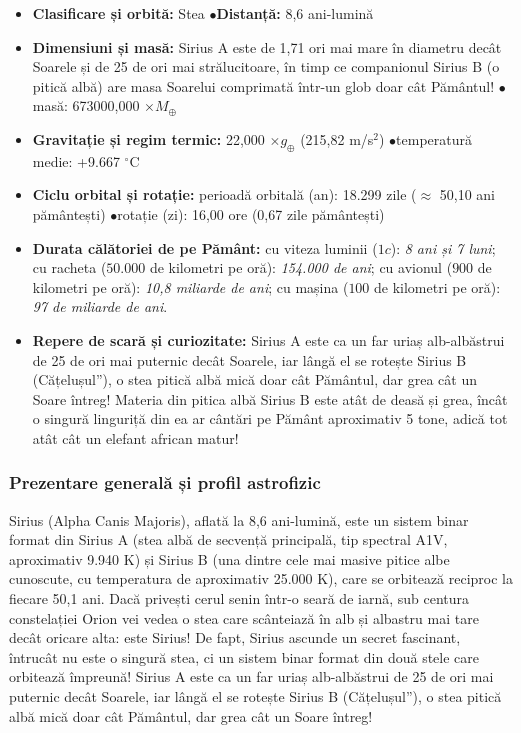 \begin{tcolorbox}[orbitardata, title={\textbf{Repere esențiale: Sirius A \& B (Luceafărul Câinelui)}}]
\small
\begin{itemize}[leftmargin=1.4em, itemsep=2pt, topsep=2pt]
  \item \textbf{Clasificare și orbită:} Stea \quad$\bullet$\quad \textbf{Distanță:} 8,6 ani-lumină
  \item \textbf{Dimensiuni și masă:} Sirius A este de 1,71 ori mai mare în diametru decât Soarele și de 25 de ori mai strălucitoare, în timp ce companionul Sirius B (o pitică albă) are masa Soarelui comprimată într-un glob doar cât Pământul! \quad$\bullet$\quad masă: 673000,000 $\times M_\oplus$
  \item \textbf{Gravitație și regim termic:} 22,000 $\times g_\oplus$ (215,82 m/s$^2$) \quad$\bullet$\quad temperatură medie: +9.667 $^\circ$C
  \item \textbf{Ciclu orbital și rotație:} perioadă orbitală (an): 18.299 zile ($\approx$ 50,10 ani pământești) \quad$\bullet$\quad rotație (zi): 16,00 ore (0,67 zile pământești)
  \item \textbf{Durata călătoriei de pe Pământ:} cu viteza luminii ($1c$): \emph{8 ani și 7 luni}; cu racheta ($50.000$ de kilometri pe oră): \emph{154.000 de ani}; cu avionul ($900$ de kilometri pe oră): \emph{10,8 miliarde de ani}; cu mașina ($100$ de kilometri pe oră): \emph{97 de miliarde de ani}.
  \item \textbf{Repere de scară și curiozitate:} Sirius A este ca un far uriaș alb-albăstrui de 25 de ori mai puternic decât Soarele, iar lângă el se rotește Sirius B (\quotedblbase{}Cățelușul\textquotedblright{}), o stea pitică albă mică doar cât Pământul, dar grea cât un Soare întreg! Materia din pitica albă Sirius B este atât de deasă și grea, încât o singură linguriță din ea ar cântări pe Pământ aproximativ 5 tone, adică tot atât cât un elefant african matur!
\end{itemize}
\end{tcolorbox}

\subsubsection*{Prezentare generală și profil astrofizic}
Sirius (Alpha Canis Majoris), aflată la 8,6 ani-lumină, este un sistem binar format din Sirius A (stea albă de secvență principală, tip spectral A1V, aproximativ 9.940 K) și Sirius B (una dintre cele mai masive pitice albe cunoscute, cu temperatura de aproximativ 25.000 K), care se orbitează reciproc la fiecare 50,1 ani. Dacă privești cerul senin într-o seară de iarnă, sub centura constelației Orion vei vedea o stea care scânteiază în alb și albastru mai tare decât oricare alta: este Sirius! De fapt, Sirius ascunde un secret fascinant, întrucât nu este o singură stea, ci un sistem binar format din două stele care orbitează împreună! Sirius A este ca un far uriaș alb-albăstrui de 25 de ori mai puternic decât Soarele, iar lângă el se rotește Sirius B (\quotedblbase{}Cățelușul\textquotedblright{}), o stea pitică albă mică doar cât Pământul, dar grea cât un Soare întreg!

